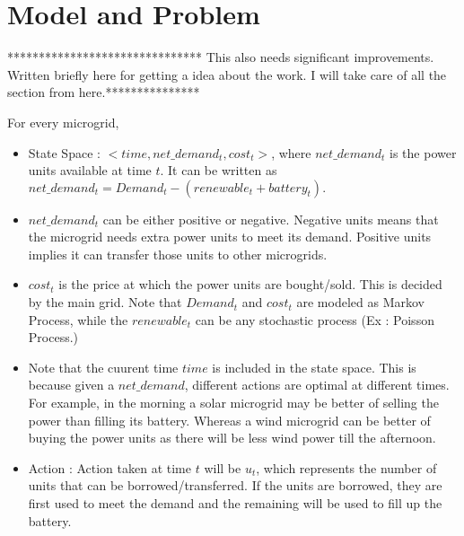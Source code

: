 \documentclass[conference]{IEEEtran}
\begin{document}

\section{Model and Problem}

******************************* This also needs significant improvements. Written briefly here for getting a idea about the work. I will take care of all the section from here.***************

 For every microgrid, 
\begin{itemize}
	\item State Space : $<time, net\_demand_{t},cost_{t}>$, where $net\_demand_{t}$ is the power units available at time $t$. It can be written as $net\_demand_{t} = Demand_{t} - (renewable_{t} + battery_{t}).$
	
	\item $net\_demand_{t}$ can be either positive or negative. Negative units means that the microgrid needs extra power units to meet its demand. Positive units implies it can transfer those units to other microgrids. 
	
	\item $cost_{t}$ is the price at which the power units are bought/sold. This is decided by the main grid. Note that $Demand_{t}$ and $cost_{t}$ are modeled as Markov Process, while the $renewable_{t}$ can be any stochastic process (Ex : Poisson Process.)
	
	\item Note that the cuurent time $time$ is included in the state space. This is because given a $net\_demand$, different actions are optimal at different times. For example, in the morning a solar microgrid may be better of selling the power than filling its battery. Whereas a wind microgrid can be better of buying the power units as there will be less wind power till the afternoon. 
	
	\item Action : Action taken at time $t$ will be $u_{t}$, which represents the number of units that can be borrowed/transferred. If the units are borrowed, they are first used to meet the demand and the remaining will be used to fill up the battery. 
	
\end{itemize}
\end{document}

